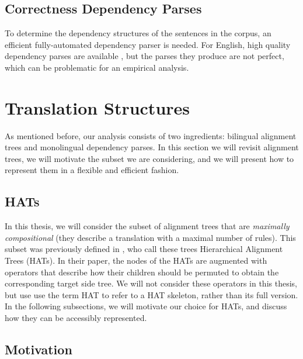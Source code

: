 \subsection{Correctness Dependency Parses}

To determine the dependency structures of the sentences in the corpus, an efficient fully-automated dependency parser is needed.  For English, high quality dependency parses are available \citep{cer2010parsing}, but the parses they produce are not perfect, which can be problematic for an empirical analysis.



\section{Translation Structures}
\label{sec:comp_structures2}

As mentioned before, our analysis consists of two ingredients: bilingual alignment trees and monolingual dependency parses. In this section we will revisit alignment trees, we will motivate the subset we are considering, and we will present how to represent them in a flexible and efficient fashion.

\subsection{HATs}

In this thesis, we will consider the subset of alignment trees that are \textit{maximally compositional} (they describe a translation with a maximal number of rules). This subset was previously defined in \cite{simaan2013hats}, who call these trees Hierarchical Alignment Trees (HATs). In their paper, the nodes of the HATs are augmented with operators that describe how their children should be permuted to obtain the corresponding target side tree. We will not consider these operators in this thesis, but use use the term HAT to refer to a HAT skeleton, rather than its full version. In the following subsections, we will motivate our choice for HATs, and discuss how they can be accessibly represented.

\subsection{Motivation}

